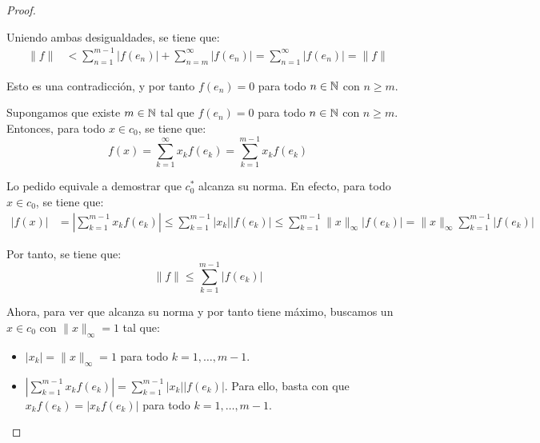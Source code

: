 \begin{ejercicio}
\begin{proof}
\begin{description}
        Uniendo ambas desigualdades, se tiene que:
        \begin{align*}
            \|f\| &< \sum_{n=1}^{m-1} |f(e_n)| + \sum_{n=m}^{\infty} |f(e_n)| = \sum_{n=1}^{\infty} |f(e_n)| = \|f\|
        \end{align*}

        Esto es una contradicción, y por tanto $f(e_n) = 0$ para todo $n \in \mathbb{N}$ con $n \geq m$.

        \item[$(2) \implies (1)$] Supongamos que existe $m \in \mathbb{N}$ tal que $f(e_n) = 0$ para todo $n \in \mathbb{N}$ con $n \geq m$. Entonces, para todo $x \in c_0$, se tiene que:
        \begin{equation*}
            f(x) = \sum_{k=1}^{\infty} x_k f(e_k) = \sum_{k=1}^{m-1} x_k f(e_k)
        \end{equation*}

        Lo pedido equivale a demostrar que $c_0^*$ alcanza su norma. En efecto, para todo $x \in c_0$, se tiene que:
        \begin{align*}
            |f(x)| &= \left|\sum_{k=1}^{m-1} x_k f(e_k)\right| \leq \sum_{k=1}^{m-1} |x_k| |f(e_k)| \leq \sum_{k=1}^{m-1} \|x\|_\infty|f(e_k)|
            = \|x\|_\infty \sum_{k=1}^{m-1} |f(e_k)|
        \end{align*}

        Por tanto, se tiene que:
        \begin{equation*}
            \|f\|\leq \sum_{k=1}^{m-1} |f(e_k)|
        \end{equation*}

        Ahora, para ver que alcanza su norma y por tanto tiene máximo, buscamos un $x \in c_0$ con $\|x\|_\infty = 1$ tal que:
        \begin{itemize}
            \item $|x_k|=\|x\|_\infty = 1$ para todo $k = 1, \ldots, m-1$.
            \item $\left|\sum\limits_{k=1}^{m-1} x_k f(e_k)\right| = \sum\limits_{k=1}^{m-1} |x_k| |f(e_k)|$. Para ello, basta con que $x_kf(e_k) = |x_k f(e_k)|$ para todo $k = 1, \ldots, m-1$.
        \end{itemize}


\end{description}
\end{proof}
\end{ejercicio}
